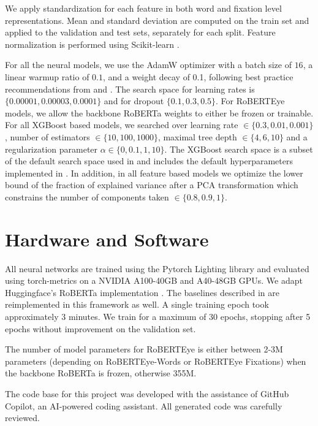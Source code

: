 We apply standardization for each feature in both word and fixation level representations. Mean and standard deviation are computed on the train set and applied to the validation and test sets, separately for each split. Feature normalization is performed using Scikit-learn \cite{pedregosa_scikit-learn_2011}.

For all the neural models, we use the AdamW optimizer \cite{loshchilov_decoupled_2018} with a batch size of $16$, a linear warmup ratio of $0.1$, and a weight decay of 0.1, following best practice recommendations from \citet{liu_roberta_2019} and \citet{mosbach_stability_2021}. The search space for learning rates is $\{0.00001, 0.00003, 0.0001\}$ and for dropout $\{0.1, 0.3, 0.5\}$. For RoBERTEye models, we allow the backbone RoBERTa weights to either be frozen or trainable. 
For all XGBoost based models, we searched over learning rate $\in \{0.3, 0.01, 0.001\}$, number of estimators $\in \{10, 100, 1000\}$, maximal tree depth $\in \{4, 6, 10\}$ and a regularization parameter $\alpha\in \{0, 0.1, 1, 10\}$. The XGBoost search space is a subset of the default search space used in \cite{h2o_Python_module} and includes the default hyperparameters implemented in \cite{chen2016xgboost}. In addition, in all feature based models we optimize the lower bound of the fraction of explained variance after a PCA transformation which constrains the number of components taken $\in \{0.8, 0.9, 1\}$.

\section{Hardware and Software}
\label{app:hardware-software}

All neural networks are trained using the Pytorch Lighting library \cite{Falcon_PyTorch_Lightning_2019,paszke2019pytorch} and evaluated using torch-metrics \cite{TorchMetrics_-_Measuring_2022} on a NVIDIA A100-40GB and A40-48GB GPUs.  We adapt Huggingface's RoBERTa implementation \cite{wolf-etal-2020-transformers}.
The baselines described in  are reimplemented in this framework as well. A single training epoch took approximately 3 minutes. We train for a maximum of 30 epochs, stopping after 5 epochs without improvement on the validation set.

The number of model parameters for RoBERTEye is either between 2-3M parameters (depending on RoBERTEye-Words or RoBERTEye Fixations) when the backbone RoBERTa is frozen, otherwise 355M.

The code base for this project was developed with the assistance of GitHub Copilot, an AI-powered coding assistant. All generated code was carefully reviewed.

